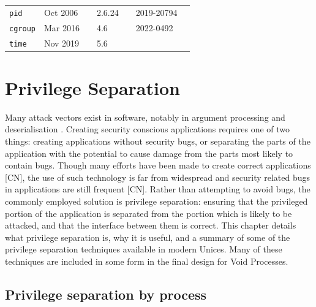 \documentclass[a4paper,12pt,twoside,openright]{report}
\begin{document}
\begin{table}
\begin{center}
\begin{tabular}{l|lr|lr|l|l}
        \texttt{pid}
            & Oct 2006 & \citep{bhattiprolu_patch_2006}
            & 2.6.24 & \citep{noauthor_linux_2008}
            & 2019-20794
            & \\

        \texttt{cgroup}
            & Mar 2016 & \citep{heo_git_2016}
            & 4.6 & \citep{torvalds_linux_2016}
            & 2022-0492
            & \\

        \texttt{time}
            & Nov 2019 & \citep{vagin_ns_2020}
            & 5.6 & \citep{noauthor_linux_2020}
            &
            &

    \end{tabular}
    \end{center}

    \label{tab:namespaces}
\end{table}


\chapter{Privilege Separation}
\label{chap:priv-sep}

Many attack vectors exist in software, notably in argument processing and deserialisation \citep{the_mitre_corporation_improper_2006,the_mitre_corporation_deserialization_2006}. Creating security conscious applications requires one of two things: creating applications without security bugs, or separating the parts of the application with the potential to cause damage from the parts most likely to contain bugs. Though many efforts have been made to create correct applications [CN], the use of such technology is far from widespread and security related bugs in applications are still frequent [CN]. Rather than attempting to avoid bugs, the commonly employed solution is privilege separation: ensuring that the privileged portion of the application is separated from the portion which is likely to be attacked, and that the interface between them is correct. This chapter details what privilege separation is, why it is useful, and a summary of some of the privilege separation techniques available in modern Unices. Many of these techniques are included in some form in the final design for Void Processes.

\section{Privilege separation by process}
\end{document}
